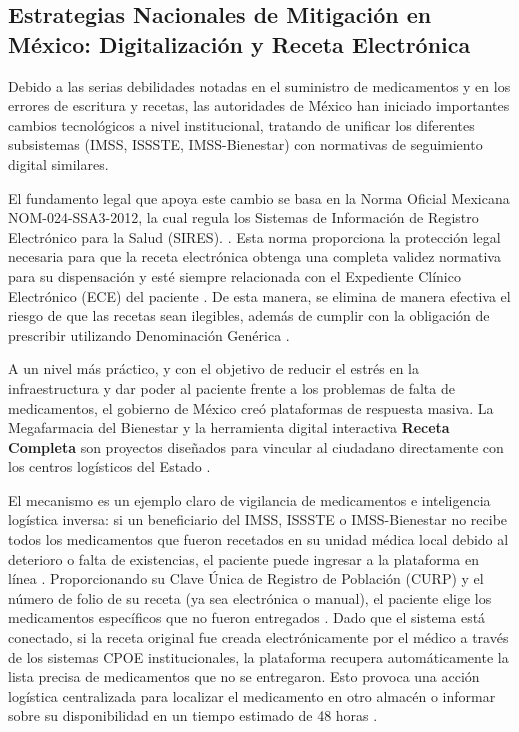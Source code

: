 \subsection{Estrategias Nacionales de Mitigación en México: Digitalización y Receta Electrónica}

Debido a las serias debilidades notadas en el suministro de medicamentos y en los errores de escritura y recetas, las autoridades de México han iniciado importantes cambios tecnológicos a nivel institucional, tratando de unificar los diferentes subsistemas (IMSS, ISSSTE, IMSS-Bienestar) con normativas de seguimiento digital similares.

El fundamento legal que apoya este cambio se basa en la Norma Oficial Mexicana NOM-024-SSA3-2012, la cual regula los Sistemas de Información de Registro Electrónico para la Salud (SIRES). \cite{ethos_handwriting_deaths}.
Esta norma proporciona la protección legal necesaria para que la receta electrónica obtenga una completa validez normativa para su dispensación y esté siempre relacionada con el Expediente Clínico Electrónico (ECE) del paciente \cite{ethos_handwriting_deaths}. 
De esta manera, se elimina de manera efectiva el riesgo de que las recetas sean ilegibles, además de cumplir con la obligación de prescribir utilizando Denominación Genérica \cite{ethos_handwriting_deaths}.

A un nivel más práctico, y con el objetivo de reducir el estrés en la infraestructura y dar poder al paciente frente a los problemas de falta de medicamentos, el gobierno de México creó plataformas de respuesta masiva. La Megafarmacia del Bienestar y la herramienta digital interactiva \textbf{Receta Completa} son proyectos diseñados para vincular al ciudadano directamente con los centros logísticos del Estado \cite{issste_receta_completa}.

El mecanismo es un ejemplo claro de vigilancia de medicamentos e inteligencia logística inversa: si un beneficiario del IMSS, ISSSTE o IMSS-Bienestar no recibe todos los medicamentos que fueron recetados en su unidad médica local debido al deterioro o falta de existencias, el paciente puede ingresar a la plataforma en línea \cite{nmas2024receta_completa}. Proporcionando su Clave Única de Registro de Población (CURP) y el número de folio de su receta (ya sea electrónica o manual), el paciente elige los medicamentos específicos que no fueron entregados \cite{nmas2024receta_completa}. Dado que el sistema está conectado, si la receta original fue creada electrónicamente por el médico a través de los sistemas CPOE institucionales, la plataforma recupera automáticamente la lista precisa de medicamentos que no se entregaron. Esto provoca una acción logística centralizada para localizar el medicamento en otro almacén o informar sobre su disponibilidad en un tiempo estimado de 48 horas \cite{nmas2024receta_completa}.

